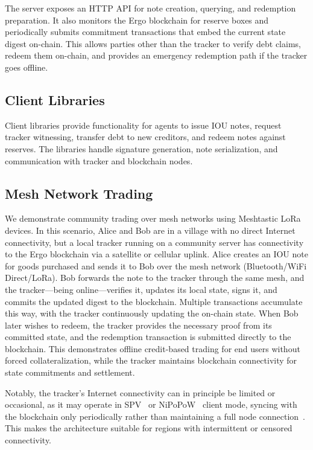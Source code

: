 \documentclass{ifcolog}
\begin{document}
The server exposes an HTTP API for note creation, querying, and redemption preparation. It also monitors the Ergo blockchain for reserve boxes and periodically submits commitment transactions that embed the current state digest on-chain. This allows parties other than the tracker to verify debt claims, redeem them on-chain, and provides an emergency redemption path if the tracker goes offline.

\subsection{Client Libraries}

Client libraries provide functionality for agents to issue IOU notes, request tracker witnessing, transfer debt to new creditors, and redeem notes against reserves. The libraries handle signature generation, note serialization, and communication with tracker and blockchain nodes.

\subsection{Mesh Network Trading}

We demonstrate community trading over mesh networks using Meshtastic LoRa devices. In this scenario, Alice and Bob are in a village with no direct Internet connectivity, but a local tracker running on a community server has connectivity to the Ergo blockchain via a satellite or cellular uplink. Alice creates an IOU note for goods purchased and sends it to Bob over the mesh network (Bluetooth/WiFi Direct/LoRa). Bob forwards the note to the tracker through the same mesh, and the tracker---being online---verifies it, updates its local state, signs it, and commits the updated digest to the blockchain. Multiple transactions accumulate this way, with the tracker continuously updating the on-chain state. When Bob later wishes to redeem, the tracker provides the necessary proof from its committed state, and the redemption transaction is submitted directly to the blockchain. This demonstrates offline credit-based trading for end users without forced collateralization, while the tracker maintains blockchain connectivity for state commitments and settlement.

Notably, the tracker's Internet connectivity can in principle be limited or occasional, as it may operate in SPV~\cite{nakamoto2008bitcoin} or NiPoPoW~\cite{kiayias2020non} client mode, syncing with the blockchain only periodically rather than maintaining a full node connection~\cite{ergoclient}. This makes the architecture suitable for regions with intermittent or censored connectivity.
\end{document}
